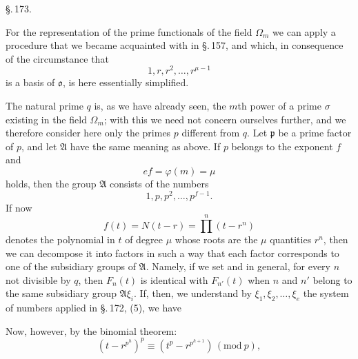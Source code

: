 \begin{center}
\S.\,173.

\end{center}

For the representation of the prime functionals of the field $\Omega_m$ we can apply a procedure that we became acquainted with in \S.\,157, and which, in consequence of the circumstance that
\[ 1, r, r^2, \ldots, r^{\mu-1} \]
is a basis of $\mathfrak{o}$, is here essentially simplified.

The natural prime $q$ is, as we have already seen, the $m$th power of a prime $\sigma$ existing in the field $\Omega_m$; with this we need not concern ourselves further, and we therefore consider here only the primes $p$ different from $q$.
Let $\mathfrak{p}$ be a prime factor of $p$, and let $\mathfrak{A}$ have the same meaning as above. If $p$ belongs to the exponent $f$ and
\[ ef = \varphi(m) = \mu \]
holds, then the group $\mathfrak{A}$ consists of the numbers
\[ 1, p, p^2, \ldots, p^{f-1}. \]
If now
\[ f(t) = N(t-r) = \prod^n (t - r^n) \]
denotes the polynomial in $t$ of degree $\mu$ whose roots are the $\mu$ quantities $r^n$, then we can decompose it into factors in such a way that each factor corresponds to one of the subsidiary groups of $\mathfrak{A}$. Namely, if we set
and in general, for every $n$ not divisible by $q$,
then $F_n(t)$ is identical with $F_{n'}(t)$ when $n$ and $n'$ belong to the same subsidiary group $\mathfrak{A}\xi_i$. If, then, we understand by $\xi_1, \xi_2, \ldots, \xi_e$ the system of numbers applied in \S.\,172, (5), we have

Now, however, by the binomial theorem:
\[ (t - r^{p^h})^p \equiv (t^p - r^{p^{h+1}}) \, (\mathrm{mod}\ p), \]
